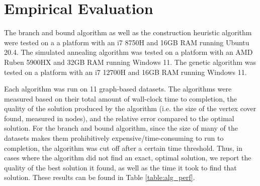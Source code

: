 \documentclass[acmlarge]{acmart}
\begin{document}

\section{Empirical Evaluation}


The branch and bound algorithm as well as the construction heuristic algorithm were tested on a a platform with an i7 8750H and 16GB RAM running Ubuntu 20.4. The simulated annealing algorithm was tested on a platform with an AMD Ruben 5900HX and 32GB RAM running Windows 11. The genetic algorithm was tested on a platform with an i7 12700H and 16GB RAM running Windows 11.

Each algorithm was run on 11 graph-based datasets. The algorithms were measured based on their total amount of wall-clock time to completion, the quality of the solution produced by the algorithm (i.e. the size of the vertex cover found, measured in nodes), and the relative error compared to the optimal solution. For the branch and bound algorithm, since the size of many of the datasets makes them prohibitively expensive/time-consuming to run to completion, the algorithm was cut off after a certain time threshold. Thus, in cases where the algorithm did not find an exact, optimal solution, we report the quality of the best solution it found, as well as the time it took to find that solution. These results can be found in Table \ref{table:alg_perf}.
\end{document}
